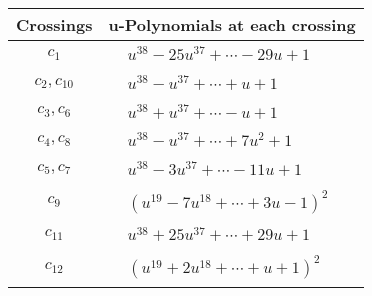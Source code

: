 \documentclass[1p]{elsarticle_modified}
\theoremstyle{definition}
\begin{document}
\begin{tabular}{m{50pt}|m{274pt}}
Crossings & \hspace{64pt}u-Polynomials at each crossing \\
\hline $$\begin{aligned}c_{1}\end{aligned}$$&$\begin{aligned}
&u^{38}-25 u^{37}+\cdots-29 u+1
\end{aligned}$\\
\hline $$\begin{aligned}c_{2},c_{10}\end{aligned}$$&$\begin{aligned}
&u^{38}- u^{37}+\cdots+u+1
\end{aligned}$\\
\hline $$\begin{aligned}c_{3},c_{6}\end{aligned}$$&$\begin{aligned}
&u^{38}+u^{37}+\cdots- u+1
\end{aligned}$\\
\hline $$\begin{aligned}c_{4},c_{8}\end{aligned}$$&$\begin{aligned}
&u^{38}- u^{37}+\cdots+7 u^2+1
\end{aligned}$\\
\hline $$\begin{aligned}c_{5},c_{7}\end{aligned}$$&$\begin{aligned}
&u^{38}-3 u^{37}+\cdots-11 u+1
\end{aligned}$\\
\hline $$\begin{aligned}c_{9}\end{aligned}$$&$\begin{aligned}
&(u^{19}-7 u^{18}+\cdots+3 u-1)^{2}
\end{aligned}$\\
\hline $$\begin{aligned}c_{11}\end{aligned}$$&$\begin{aligned}
&u^{38}+25 u^{37}+\cdots+29 u+1
\end{aligned}$\\
\hline $$\begin{aligned}c_{12}\end{aligned}$$&$\begin{aligned}
&(u^{19}+2 u^{18}+\cdots+u+1)^{2}
\end{aligned}$\\
\hline
\end{tabular}\\~\\
\end{document}
